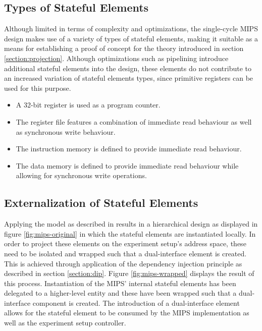 \documentclass{article}
\begin{document}
\subsection{Types of Stateful Elements}

Although limited in terms of complexity and optimizations, the single-cycle MIPS design makes use of a variety of types of stateful elements, making it suitable as a means for establishing a proof of concept for the theory introduced in section \ref{section:projection}. Although optimizations such as pipelining introduce additional stateful elements into the design, these elements do not contribute to an increased variation of stateful elements types, since primitive registers can be used for this purpose. 

\begin{itemize}
    \item A 32-bit register is used as a program counter.
    \item The register file features a combination of immediate read behaviour as well as synchronous write behaviour.
    \item The instruction memory is defined to provide immediate read behaviour.
    \item The data memory is defined to provide immediate read behaviour while allowing for synchronous write operations. 
\end{itemize}

\subsection{Externalization of Stateful Elements}

Applying the model as described in \cite{bos2016model} results in a hierarchical design as displayed in figure \ref{fig:mips-original} in which the stateful elements are instantiated locally. In order to project these elements on the experiment setup's address space, these need to be isolated and wrapped such that a dual-interface element is created. This is achieved through application of the dependency injection principle as described in section \ref{section:dip}. Figure \ref{fig:mips-wrapped} displays the result of this process. Instantiation of the MIPS' internal stateful elements has been delegated to a higher-level entity and these have been wrapped such that a dual-interface component is created. The introduction of a dual-interface element allows for the stateful element to be consumed by the MIPS implementation as well as the experiment setup controller. 
\end{document}
